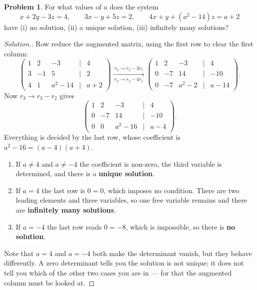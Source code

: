 \documentclass[11pt,a4paper]{article}
\theoremstyle{definition}
\newtheorem{problemx}{Problem}[section]
\newenvironment{problem}{\begin{problemx}}{\end{problemx}}
\newenvironment{solution}
  {\renewcommand{\qedsymbol}{}\begin{proof}[\textit{Solution}.]}
  {\end{proof}}
\begin{document}
\begin{problem}
For what values of $a$ does the system
$$x+2y-3z=4,\qquad 3x-y+5z=2,\qquad 4x+y+(a^2-14)z=a+2$$
have (i) no solution, (ii) a unique solution, (iii) infinitely many solutions?
\end{problem}
\begin{solution}
Row reduce the augmented matrix, using the first row to clear the first column:
$$\begin{pmatrix}1&2&-3&|&4\\3&-1&5&|&2\\4&1&a^2-14&|&a+2\end{pmatrix}
\xrightarrow[\ r_3\rightarrow r_3-4r_1\ ]{\ r_2\rightarrow r_2-3r_1\ }
\begin{pmatrix}1&2&-3&|&4\\0&-7&14&|&-10\\0&-7&a^2-2&|&a-14\end{pmatrix}.$$
Now $r_3\rightarrow r_3-r_2$ gives
$$\begin{pmatrix}1&2&-3&|&4\\0&-7&14&|&-10\\0&0&a^2-16&|&a-4\end{pmatrix}.$$
Everything is decided by the last row, whose coefficient is
$a^2-16=(a-4)(a+4)$.
\begin{enumerate}
\item[(ii)] If $a\neq 4$ and $a\neq -4$ the coefficient is non-zero, the third
variable is determined, and there is a \textbf{unique solution}.
\item[(iii)] If $a=4$ the last row is $0=0$, which imposes no condition. There
are two leading elements and three variables, so one free variable remains and
there are \textbf{infinitely many solutions}.
\item[(i)] If $a=-4$ the last row reads $0=-8$, which is impossible, so there
is \textbf{no solution}.
\end{enumerate}
Note that $a=4$ and $a=-4$ both make the determinant vanish, but they behave
differently. A zero determinant tells you the solution is not unique; it does
not tell you which of the other two cases you are in --- for that the augmented
column must be looked at.
\end{solution}
\end{document}
